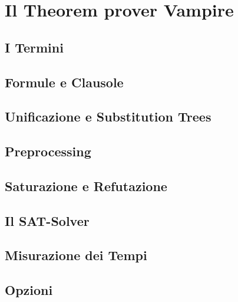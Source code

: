 \documentclass[./main.tex]{subfiles}
\begin{document}
\chapter{Il Theorem prover Vampire}

\section{I Termini}
\section{Formule e Clausole}
\section{Unificazione e Substitution Trees} 
\section{Preprocessing}
\section{Saturazione e Refutazione}
\section{Il SAT-Solver}
\section{Misurazione dei Tempi}
\section{Opzioni}
\end{document}
